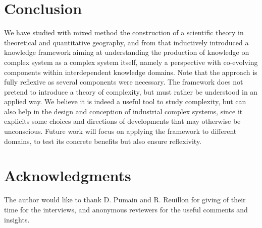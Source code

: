 \documentclass[runningheads,a4paper]{llncs2e/llncs}
\begin{document}
\section{Conclusion}



We have studied with mixed method the construction of a scientific theory in theoretical and quantitative geography, and from that inductively introduced a knowledge framework aiming at understanding the production of knowledge on complex system as a complex system itself, namely a perspective with co-evolving components within interdependent knowledge domains. Note that the approach is fully reflexive as several components were necessary. The framework does not pretend to introduce a theory of complexity, but must rather be understood in an applied way. We believe it is indeed a useful tool to study complexity, but can also help in the design and conception of industrial complex systems, since it explicits some choices and directions of developments that may otherwise be unconscious. Future work will focus on applying the framework to different domains, to test its concrete benefits but also ensure reflexivity.



\section*{Acknowledgments}

The author would like to thank D. Pumain and R. Reuillon for giving of their time for the interviews, and anonymous reviewers for the useful comments and insights.





%
%
\end{document}

